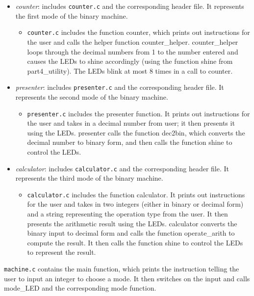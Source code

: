 \documentclass[letterpaper,11pt]{article}
\begin{document}
\begin{itemize}
        \item \textit{counter}: includes \texttt{counter.c} and the corresponding header file. It represents the first mode of the binary machine.
        \begin{itemize}
            \item \texttt{counter.c} includes the function counter, which prints out instructions for the user and calls the helper function counter\_helper.  counter\_helper loops through the decimal numbers from 1 to the number entered and causes the LEDs to shine accordingly (using the function shine from part4\_utility). The LEDs blink at most 8 times in a call to counter.
        \end{itemize}
        \item \textit{presenter}: includes \texttt{presenter.c} and the corresponding header file. It represents the second mode of the binary machine.
        \begin{itemize}
            \item \texttt{presenter.c} includes the presenter function. It prints out instructions for the user and takes in a decimal number from user; it then presents it using the LEDs. presenter calls the function dec2bin, which converts the decimal number to binary form, and then calls the function shine to control the LEDs.
        \end{itemize}
        \item \textit{calculator}: includes \texttt{calculator.c} and the corresponding header file. It represents the third mode of the binary machine.
        \begin{itemize}
            \item \texttt{calculator.c} includes the function calculator.  It prints out instructions for the user and takes in two integers (either in binary or decimal form) and a string representing the operation type from the user. It then presents the arithmetic result using the LEDs. calculator converts the binary input to decimal form and calls the function operate\_arith to compute the result. It then calls the function shine to control the LEDs to represent the result.
        \end{itemize}
    \end{itemize}

    \noindent \texttt{machine.c} contains the main function, which prints the instruction telling the user to input an integer to choose a mode. It then switches on the input and calls mode\_LED and the corresponding mode function.
\end{document}
